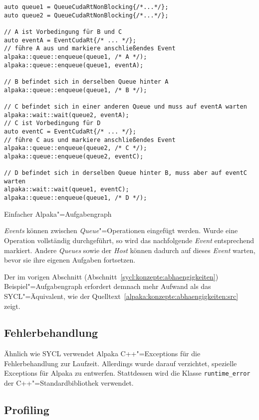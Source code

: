 \begin{code}
    \begin{verbatim}
auto queue1 = QueueCudaRtNonBlocking{/*...*/};
auto queue2 = QueueCudaRtNonBlocking{/*...*/};

// A ist Vorbedingung für B und C
auto eventA = EventCudaRt{/* ... */};
// führe A aus und markiere anschließendes Event
alpaka::queue::enqueue(queue1, /* A */);
alpaka::queue::enqueue(queue1, eventA);

// B befindet sich in derselben Queue hinter A
alpaka::queue::enqueue(queue1, /* B */);

// C befindet sich in einer anderen Queue und muss auf eventA warten
alpaka::wait::wait(queue2, eventA);
// C ist Vorbedingung für D
auto eventC = EventCudaRt{/* ... */};
// führe C aus und markiere anschließendes Event
alpaka::queue::enqueue(queue2, /* C */);
alpaka::queue::enqueue(queue2, eventC);

// D befindet sich in derselben Queue hinter B, muss aber auf eventC warten
alpaka::wait::wait(queue1, eventC);
alpaka::queue::enqueue(queue1, /* D */);
    \end{verbatim}
    \caption{Einfacher Alpaka"=Aufgabengraph}
    \label{alpaka:konzepte:abhaengigkeiten:src}
\end{code}

\textit{Events} können zwischen \textit{Queue}"=Operationen eingefügt werden.
Wurde eine Operation vollständig durchgeführt, so wird das nachfolgende
\textit{Event} entsprechend markiert. Andere \textit{Queues} sowie der
\textit{Host} können dadurch auf dieses \textit{Event} warten, bevor sie ihre
eigenen Aufgaben fortsetzen.

Der im vorigen Abschnitt (Abschnitt~\ref{sycl:konzepte:abhaengigkeiten})
Beispiel"=Aufgabengraph erfordert demnach mehr Aufwand als das SYCL"=Äquivalent,
wie der Quelltext~\ref{alpaka:konzepte:abhaengigkeiten:src} zeigt.

\subsection{Fehlerbehandlung}

Ähnlich wie SYCL verwendet Alpaka C++"=Exceptions für die Fehlerbehandlung zur
Laufzeit. Allerdings wurde darauf verzichtet, spezielle Exceptions für Alpaka
zu entwerfen. Stattdessen wird die Klasse \texttt{runtime\_error} der
C++"=Standardbibliothek verwendet.

\subsection{Profiling}

